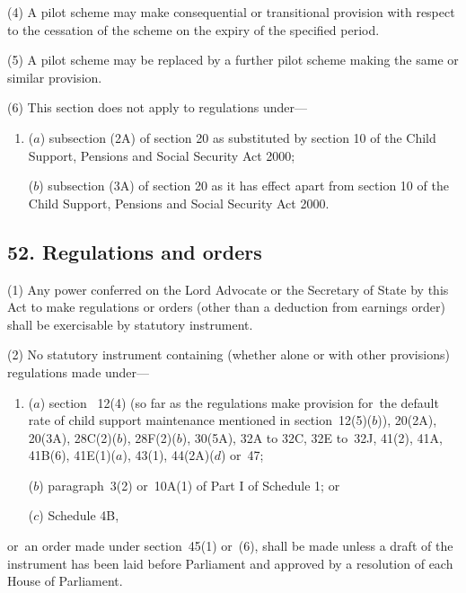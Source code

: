 \documentclass[12pt,a4paper]{article}
\begin{document}
(4)
A pilot scheme may make consequential or transitional provision with respect to the cessation of the scheme on the expiry of the specified period.

(5)
A pilot scheme may be replaced by a further pilot scheme making the same or similar provision.

(6) This section does not apply to regulations under—
\begin{enumerate}\item[]
($a$) subsection (2A) of section 20 as substituted by section 10 of the Child Support, Pensions and Social Security Act 2000;

($b$) subsection (3A) of section 20 as it has effect apart from section 10 of the Child Support, Pensions and Social Security Act 2000.
\end{enumerate}


\subsection{52. Regulations and orders}

(1) Any power conferred on 
the Lord Advocate or the Secretary of State by this Act to make regulations or orders (other than a deduction from earnings order) shall be exercisable by statutory instrument.

(2) No statutory instrument containing (whether alone or with other provisions) regulations made under—
\begin{enumerate}\item[]
($a$) section~%
12(4)  (so far as the regulations make provision for~the default rate of child support maintenance mentioned in section~12(5)($b$)), 
20(2A), 20(3A),  %
28C(2)($b$), 28F(2)($b$), 30(5A), 
32A to 32C, 32E to~32J,  %
41(2), 41A, 41B(6), 
41E(1)($a$),  %
43(1), 44(2A)($d$)
or~47;

($b$) paragraph~3(2)  or~10A(1)  of Part I of Schedule 1; or

($c$) Schedule 4B,
\end{enumerate}
or~an order made under section~45(1)  or~(6), shall be made unless a draft of the instrument has been laid before Parliament and approved by a resolution of each House of Parliament.
\end{document}
